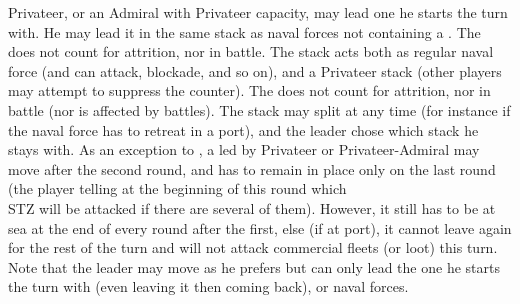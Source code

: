 \label{chSpecific:Raiding
  Privateer admirals}
Privateer, or an Admiral with Privateer capacity, may lead one \corsaire he
starts the turn with.  He may lead it in the same stack as naval forces not
containing a \FLEET.  The \corsaire does not count for attrition, nor in
battle.  The stack acts both as regular naval force (and can attack, blockade,
and so on), and a Privateer stack (other players may attempt to suppress the
\corsaire counter).  The \corsaire does not count for attrition, nor in battle
(nor is affected by battles).  The stack may split at any time (for instance
if the naval force has to retreat in a port), and the leader chose which stack
he stays with.
\bparag As an exception to , a
\corsaire led by Privateer or Privateer-Admiral may move after the second
round, and has to remain in place only on the last round (the player telling
at the beginning of this round which \CTZ\\STZ will be attacked if there are
several of them). However, it still has to be at sea at the end of every round
after the first, else (if at port), it cannot leave again for the rest of the
turn and will not attack commercial fleets (or loot) this turn.
\bparag Note that the leader may move as he prefers but can only lead the one
\corsaire he starts the turn with (even leaving it then coming back), or naval
forces.
%

